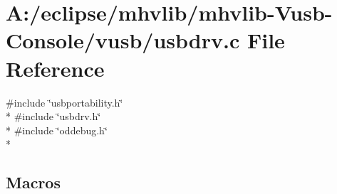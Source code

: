 \hypertarget{mhvlib-_vusb-_console_2vusb_2usbdrv_8c}{\section{A\-:/eclipse/mhvlib/mhvlib-\/\-Vusb-\/\-Console/vusb/usbdrv.c File Reference}
\label{mhvlib-_vusb-_console_2vusb_2usbdrv_8c}
}
{\ttfamily \#include \char`\"{}usbportability.\-h\char`\"{}}\\*
{\ttfamily \#include \char`\"{}usbdrv.\-h\char`\"{}}\\*
{\ttfamily \#include \char`\"{}oddebug.\-h\char`\"{}}\\*
\subsection*{Macros}
